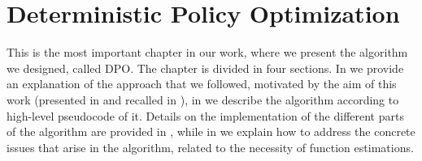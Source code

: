 \chapter{Deterministic Policy Optimization} \label{chap:dpo}
This is the most important chapter in our work, where we present the algorithm we designed, called \acf{DPO}. The chapter is divided in four sections. In  we provide an explanation of the approach that we followed, motivated by the aim of this work (presented in  and recalled in ), in  we describe the algorithm according to high-level pseudocode of it. Details on the implementation of the different parts of the algorithm are provided in , while in  we explain how to address the concrete issues that arise in the algorithm, related to the necessity of function estimations.
 
